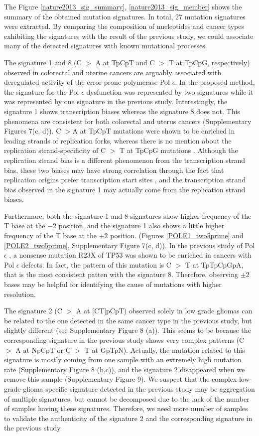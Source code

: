 The Figure \ref{nature2013_sig_summary},  \ref{nature2013_sig_member} shows the summary of the obtained mutation signatures.
In total, 27 mutation signatures were extracted.
By comparing the composition of nucleotides and cancer types exhibiting the signatures with the result of the previous study,
we could associate many of the detected signatures with known mutational processes.



The signature 1 and 8 (C $>$ A at TpCpT and C $>$ T at TpCpG, respectively) observed in colorectal and uterine cancers
are arguably associated with deregulated activity of the error-prone polymerase Pol $\epsilon$.
In the proposed method, the signature for the Pol $\epsilon$ dysfunction was represented by two signatures
while it was represented by one signature in the previous study.
Interestingly, the signature 1 shows transcription biases whereas the signature 8 does not.
This phenomena are consistent for both colorectal and uterus cancers (Supplementary Figures 7(c, d)).
C $>$A at TpCpT mutations were shown to be enriched in leading strands of replication forks,
whereas there is no mention about the replication strand-specificity of C $>$ T at TpCpG mutations \cite{pmid25228659}.
Although the replication strand bias is a different phenomenon from the transcription strand bias, these two biases may have strong correlation
through the fact that replication origins prefer transcription start sites \cite{pmid23187890},
and the transcription strand bias observed in the signature 1 may actually come from the replication strand biases.

Furthermore, both the signature 1 and 8 signatures show higher frequency of the T base at the $-2$ position,
and the signature 1 also shows a little higher frequency of the T base at the $+2$ position.
 (Figures \ref{POLE1_two5prime} and \ref{POLE2_two5prime}, Supplementary Figure 7(c, d)).
In the previous study of Pol $\epsilon$  \cite{pmid25228659}, 
a nonsense mutation R23X of TP53 was shown to be enriched in cancers with Pol $\epsilon$ defects.
In fact, the pattern of this mutation is C $>$ T at TpTpCpGpA, that is the most consistent patten with the signature 8.
Therefore, observing $\pm 2$ bases may be helpful for identifying the cause of mutations with higher resolution.


The signature 2 (C $>$ A at [CT]pCpT) observed solely in low grade gliomas
can be related to the one detected in the same cancer type in the previous study, but slightly different (see Supplementary Figure 8 (a)). 
This seems to be because the corresponding signature in the previous study shows very complex patterns (C $>$ A at NpCpT or C $>$ T at GpTpN).
Actually, the mutation related to this signature is mostly coming from one sample with an extremely high mutation rate (Supplementary Figure 8 (b,c)), 
and the signature 2 disappeared when we remove this sample (Supplementary Figure 9).
We suspect that the complex low-grade-glioma specific signature detected in the previous study may be aggregation of multiple signatures,
but cannot be decomposed due to the lack of the number of samples having these signatures.
Therefore, we need more number of samples to validate the authenticity of the signature 2 and the corresponding signature in the previous study.


